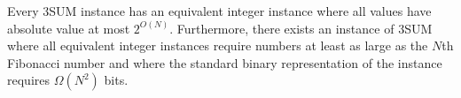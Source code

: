 \begin{contribution}[label=lem:bitsize,restate=TheoremSUMEncodingBitsize]
Every 3SUM instance has an equivalent integer instance
where all values have absolute value at most $2^{O(N)}$. Furthermore, there
exists an instance of 3SUM where all equivalent integer instances
require numbers at least as large as the $N$th Fibonacci number and where the
standard binary representation of the instance requires $\Omega(N^2)$ bits.
\end{contribution}
